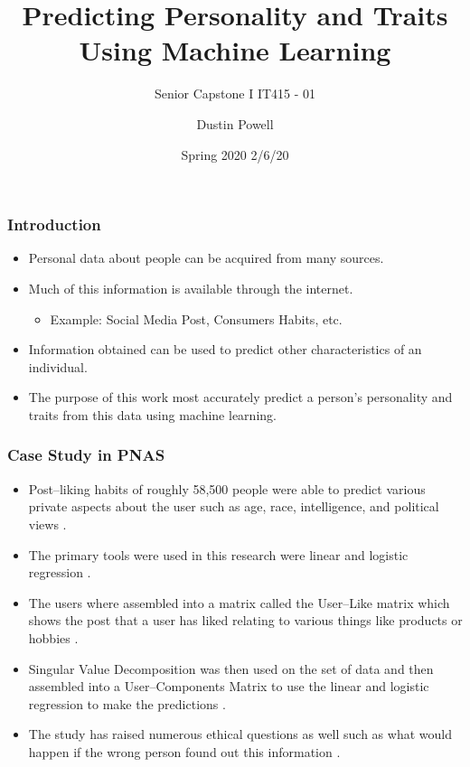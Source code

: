 \documentclass{beamer}
\title{Predicting Personality and Traits Using Machine Learning}
\subtitle{Senior Capstone I IT415 - 01}
\date{Spring 2020 2/6/20}
\author{Dustin Powell}
\institute{Cumberland University}
\begin{document}
\newtheorem{q1}{Question 1}
\newtheorem{q2}{Question 2}
 
\frame{\titlepage}

\begin{frame}
\frametitle{Introduction}
\begin{itemize}
    \item Personal data about people can be acquired from many sources.
    \item Much of this information is available through the internet.
    \begin{itemize}
        \item Example: Social Media Post, Consumers Habits, etc.
    \end{itemize}
    \item Information obtained can be used to predict other characteristics of an individual.
    \item The purpose of this work most accurately predict a person's personality and traits from this data using machine learning.
\end{itemize}
\end{frame}

\begin{frame}
\frametitle{Case Study in PNAS}
\begin{itemize}
    \item Post--liking habits of roughly 58,500 people were able to predict various private aspects about the user such as age, race, intelligence, and political views \cite{Kosinski2013}.
    \item The primary tools were used in this research were linear and logistic regression \cite{Kosinski2013}. 
    \item The users where assembled into a matrix called the User--Like matrix which shows the post that a user has liked relating to various things like products or hobbies \cite{Kosinski2013}. 
    \item Singular Value Decomposition was then used on the set of data and then assembled into a User--Components Matrix to use the linear and logistic regression to make the predictions \cite{Kosinski2013}. 
    \item  The study has raised numerous ethical questions as well such as what would happen if the wrong person found out this information  \cite{Kosinski2013}.
\end{itemize}
\end{frame}
\end{document}

